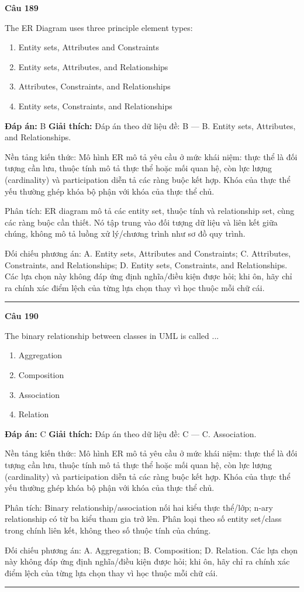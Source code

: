 \documentclass[11pt,a4paper]{article}
\newenvironment{question}[1]{%
  \par\vspace{1em}\noindent\textbf{\large Câu #1}\par\vspace{0.4em}
}{%
  \par\vspace{1em}\hrule\vspace{0.6em}
}
\newenvironment{choices}{%
  \begin{enumerate}[label=\textbf{\Alph*.},leftmargin=2.2em,itemsep=2pt,topsep=3pt]
}{%
  \end{enumerate}
}
\newcommand{\choice}{\item}
\begin{document}
\begin{question}{189}
The ER Diagram uses three principle element types:
\begin{choices}
\choice Entity sets, Attributes and Constraints
\choice Entity sets, Attributes, and Relationships
\choice Attributes, Constraints, and Relationships
\choice Entity sets, Constraints, and Relationships
\end{choices}
\textbf{Đáp án:} B
\textbf{Giải thích:} Đáp án theo dữ liệu đề: B — B. Entity sets, Attributes, and Relationships.

Nền tảng kiến thức: Mô hình ER mô tả yêu cầu ở mức khái niệm: thực thể là đối tượng cần lưu, thuộc tính mô tả thực thể hoặc mối quan hệ, còn lực lượng (cardinality) và participation diễn tả các ràng buộc kết hợp. Khóa của thực thể yếu thường ghép khóa bộ phận với khóa của thực thể chủ.

Phân tích: ER diagram mô tả các entity set, thuộc tính và relationship set, cùng các ràng buộc cần thiết. Nó tập trung vào đối tượng dữ liệu và liên kết giữa chúng, không mô tả luồng xử lý/chương trình như sơ đồ quy trình.

Đối chiếu phương án: A. Entity sets, Attributes and Constraints; C. Attributes, Constraints, and Relationships; D. Entity sets, Constraints, and Relationships. Các lựa chọn này không đáp ứng định nghĩa/điều kiện được hỏi; khi ôn, hãy chỉ ra chính xác điểm lệch của từng lựa chọn thay vì học thuộc mỗi chữ cái.
\end{question}

\begin{question}{190}
The binary relationship between classes in UML is called ...
\begin{choices}
\choice Aggregation
\choice Composition
\choice Association
\choice Relation
\end{choices}
\textbf{Đáp án:} C
\textbf{Giải thích:} Đáp án theo dữ liệu đề: C — C. Association.

Nền tảng kiến thức: Mô hình ER mô tả yêu cầu ở mức khái niệm: thực thể là đối tượng cần lưu, thuộc tính mô tả thực thể hoặc mối quan hệ, còn lực lượng (cardinality) và participation diễn tả các ràng buộc kết hợp. Khóa của thực thể yếu thường ghép khóa bộ phận với khóa của thực thể chủ.

Phân tích: Binary relationship/association nối hai kiểu thực thể/lớp; n-ary relationship có từ ba kiểu tham gia trở lên. Phân loại theo số entity set/class trong chính liên kết, không theo số thuộc tính của chúng.

Đối chiếu phương án: A. Aggregation; B. Composition; D. Relation. Các lựa chọn này không đáp ứng định nghĩa/điều kiện được hỏi; khi ôn, hãy chỉ ra chính xác điểm lệch của từng lựa chọn thay vì học thuộc mỗi chữ cái.
\end{question}
\end{document}
